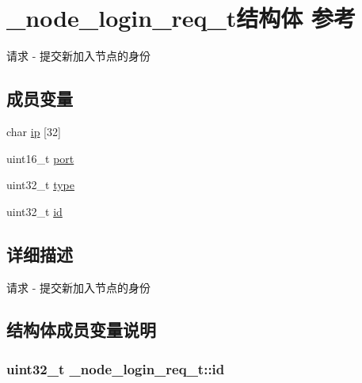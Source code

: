\hypertarget{a00038}{}\section{\+\_\+node\+\_\+login\+\_\+req\+\_\+t结构体 参考}
\label{a00038}


请求 -\/ 提交新加入节点的身份  


\subsection*{成员变量}
\begin{DoxyCompactItemize}
\item 
char \hyperlink{a00038_ae712d0a161373e04dc6fdb44e215a6f3_ae712d0a161373e04dc6fdb44e215a6f3}{ip} \mbox{[}32\mbox{]}
\item 
uint16\+\_\+t \hyperlink{a00038_a69d85f411c1b30cfb5cf3656ba479098_a69d85f411c1b30cfb5cf3656ba479098}{port}
\item 
uint32\+\_\+t \hyperlink{a00038_a9e4bf1dd6adaa732cefb24a4d45e3b39_a9e4bf1dd6adaa732cefb24a4d45e3b39}{type}
\item 
uint32\+\_\+t \hyperlink{a00038_abbb02bf5214304c279cbf8afa80191f3_abbb02bf5214304c279cbf8afa80191f3}{id}
\end{DoxyCompactItemize}


\subsection{详细描述}
请求 -\/ 提交新加入节点的身份 

\subsection{结构体成员变量说明}
\hypertarget{a00038_abbb02bf5214304c279cbf8afa80191f3_abbb02bf5214304c279cbf8afa80191f3}{}
\subsubsection[{id}]{\setlength{\rightskip}{0pt plus 5cm}uint32\+\_\+t \+\_\+node\+\_\+login\+\_\+req\+\_\+t\+::id}\label{a00038_abbb02bf5214304c279cbf8afa80191f3_abbb02bf5214304c279cbf8afa80191f3}
\hypertarget{a00038_ae712d0a161373e04dc6fdb44e215a6f3_ae712d0a161373e04dc6fdb44e215a6f3}{}
